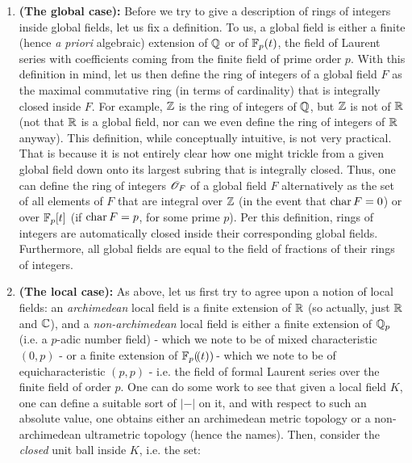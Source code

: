             \begin{example} \label{example: ring_of_integers}
                \noindent
                \begin{enumerate}
                    \item \textbf{(The global case):} Before we try to give a description of rings of integers inside global fields, let us fix a definition. To us, a global field is either a finite (hence \textit{a priori} algebraic) extension of $\mathbb{Q}$ or of $\mathbb{F}_p(t)$, the field of Laurent series with coefficients coming from the finite field of prime order $p$. With this definition in mind, let us then define the ring of integers of a global field $F$ as the maximal commutative ring (in terms of cardinality) that is integrally closed inside $F$. For example, $\mathbb{Z}$ is the ring of integers of $\mathbb{Q}$, but $\mathbb{Z}$ is not of $\mathbb{R}$ (not that $\mathbb{R}$ is a global field, nor can we even define the ring of integers of $\mathbb{R}$ anyway). This definition, while conceptually intuitive, is not very practical. That is because it is not entirely clear how one might trickle from a given global field down onto its largest subring that is integrally closed. Thus, one can define the ring of integers $\mathscr{O}_F$ of a global field $F$ alternatively as the set of all elements of $F$ that are integral over $\mathbb{Z}$ (in the event that $\operatorname{char} F = 0$) or over $\mathbb{F}_p[t]$ (if $\operatorname{char} F = p$, for some prime $p$). Per this definition, rings of integers are automatically closed inside their corresponding global fields. Furthermore, all global fields are equal to the field of fractions of their rings of integers.
                    \item \textbf{(The local case):} As above, let us first try to agree upon a notion of local fields: an \textit{archimedean} local field is a finite extension of $\mathbb{R}$ (so actually, just $\mathbb{R}$ and $\mathbb{C}$), and a \textit{non-archimedean} local field is either a finite extension of $\mathbb{Q}_p$ (i.e. a $p$-adic number field) - which we note to be of mixed characteristic $(0,p)$ - or a finite extension of $\mathbb{F}_p(\!(t))\!$ - which we note to be of equicharacteristic $(p, p)$ - i.e. the field of formal Laurent series over the finite field of order $p$. One can do some work to see that given a local field $K$, one can define a suitable sort of  $|-|$ on it, and with respect to such an absolute value, one obtains either an archimedean metric topology or a non-archimedean ultrametric topology (hence the names). Then, consider the \textit{closed} unit ball inside $K$, i.e. the set:

\end{enumerate}
\end{example}
